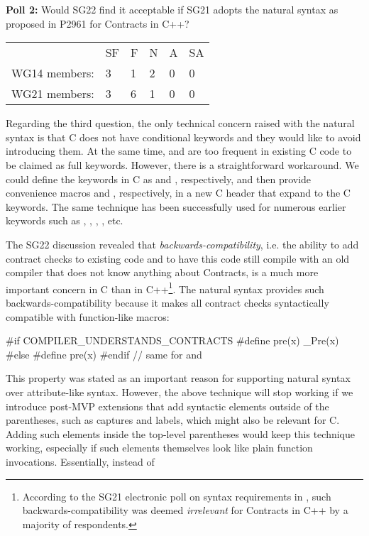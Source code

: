 \begin{adjustwidth}{0.5cm}{0.5cm}
\textbf{Poll 2:} Would SG22 find it acceptable if SG21 adopts the natural syntax as proposed in P2961 for Contracts in C++?

\begin{tabular}{l lllll}
 &SF & F & N & A & SA \\
WG14 members: & 3 & 1 & 2 & 0 & 0 \\
WG21 members: & 3 & 6 & 1 & 0 & 0
\end{tabular}
\end{adjustwidth}

Regarding the third question, the only technical concern raised with the natural syntax is that C does not have conditional keywords and they would like to avoid introducing them. At the same time,  and  are too frequent in existing C code to be claimed as full keywords. However, there is a straightforward workaround. We could define the keywords in C as  and , respectively, and then provide convenience macros  and , respectively, in a new C header  that expand to the C keywords. The same technique has been successfully used for numerous earlier keywords such as , , , , etc.

The SG22 discussion revealed that \emph{backwards-compatibility}, i.e. the ability to add contract checks to existing code and to have this code still compile with an old compiler that does not know anything about Contracts, is a much more important concern in C than in C++\footnote{According to the SG21 electronic poll on syntax requirements in \cite{P2885R3}, such backwards-compatibility was deemed \emph{irrelevant} for Contracts in C++ by a majority of respondents.}. The natural syntax provides such backwards-compatibility because it makes all contract checks syntactically compatible with function-like macros:

\begin{codeblock}
#if COMPILER_UNDERSTANDS_CONTRACTS
  #define pre(x) _Pre(x)
#else
  #define pre(x)
#endif
// same for  and 
\end{codeblock}

This property was stated as an important reason for supporting natural syntax over attribute-like syntax. However, the above technique will stop working if we introduce post-MVP extensions that add syntactic elements outside of the parentheses, such as captures and labels,
which might also be relevant for C. Adding such elements inside the top-level parentheses would keep this technique working, especially if such elements themselves look like plain function invocations. Essentially, instead of

